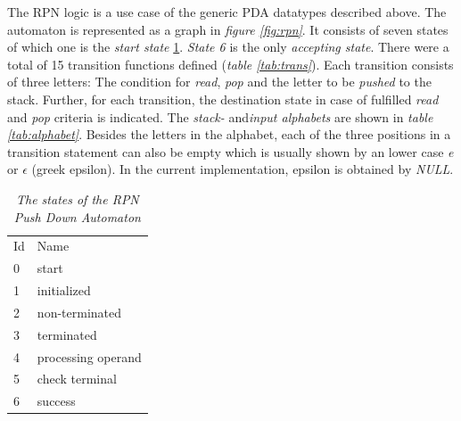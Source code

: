 \documentclass[a4paper,11pt,twoside]{article}
\begin{document}
The RPN logic is a use case of the generic PDA datatypes described
above. The automaton is represented as a graph in \textit{figure
  \ref{fig:rpn}}. It consists of seven states of which one
is the \textit{start state} \ref{tab:states}. \textit{State 6} is the
only \textit{accepting state}. There were a total of 15 transition
functions defined (\textit{table \ref{tab:trans}}). Each transition
consists of three letters: The condition for \textit{read},
\textit{pop} and the letter to be \textit{pushed} to the
stack. Further, for each transition, the destination state in case of
fulfilled \textit{read} and \textit{pop} criteria is indicated. The
\textit{stack-} and\textit{input alphabets} are shown in \textit{table
  \ref{tab:alphabet}}. Besides the letters in the alphabet, each of
the three positions in a transition statement can also be empty which
is usually shown by an lower case \textit{e} or $\epsilon$ (greek
epsilon). In the current implementation, epsilon is obtained by
\textit{NULL}.

\begin{table}[]
\centering
\caption{\textit{The states of the RPN Push Down Automaton}}
\label{tab:states}
\begin{tabular}{ll}
Id & Name                   \\
0  & start                  \\
1  & initialized            \\
2  & non-terminated         \\
3  & terminated             \\
4  & processing operand     \\
5  & check terminal         \\
6  & success               
\end{tabular}
\end{table}
\end{document}
